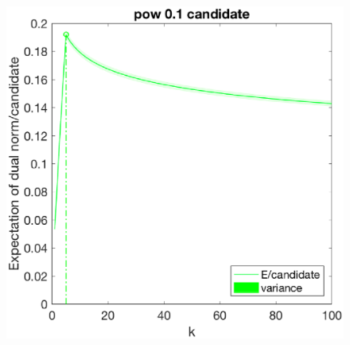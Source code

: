 \documentclass[12pt]{article}
\begin{document}
\begin{figure}[h]
\begin{minipage}[c]{.3\linewidth}
    \end{minipage}
    \hfill%
    \begin{minipage}[c]{.3\linewidth}
        \centering
        \includegraphics[width=\linewidth]{Fig/dualnorm-u0ones-k0-5-candidatepow.eps}
    \end{minipage}
\end{figure}
\end{document}
